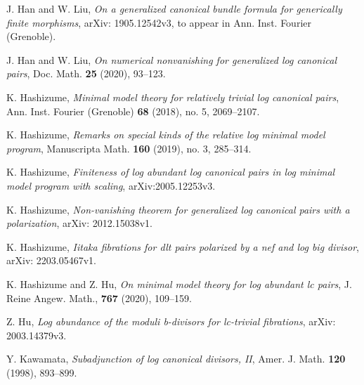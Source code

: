 \documentclass[11pt]{amsart}
\numberwithin{equation}{section}
\theoremstyle{definition}
\theoremstyle{definition}
\theoremstyle{definition}
\begin{document}
\begin{thebibliography}{99}
 J. Han and W. Liu, \textit{On a generalized canonical bundle formula for generically finite morphisms}, arXiv: 1905.12542v3,  to appear in Ann. Inst. Fourier (Grenoble).

 J. Han and W. Liu, \textit{On numerical nonvanishing for generalized log canonical pairs}, Doc. Math. \textbf{25} (2020), 93--123.

 K. Hashizume, \textit{Minimal model theory for relatively trivial log canonical pairs}, Ann. Inst. Fourier (Grenoble) \textbf{68} (2018), no. 5, 2069--2107.

 K. Hashizume, \textit{Remarks on special kinds of the relative log minimal model program}, Manuscripta Math. \textbf{160} (2019), no. 3, 285--314.


 K. Hashizume, \textit{Finiteness of log abundant log canonical pairs in log minimal model program with scaling}, arXiv:2005.12253v3.

 K. Hashizume, \textit{Non-vanishing theorem for generalized log canonical pairs with a polarization}, arXiv: 2012.15038v1.

 K. Hashizume, \textit{Iitaka fibrations for dlt pairs polarized by a nef and log big divisor}, arXiv: 2203.05467v1.


  K. Hashizume and Z. Hu, \textit{On minimal model theory for log abundant lc pairs}, J. Reine Angew. Math., \textbf{767} (2020), 109--159. 

 Z. Hu, \textit{Log abundance of the moduli b-divisors for lc-trivial fibrations}, arXiv: 2003.14379v3.





 Y. Kawamata, \textit{Subadjunction of log canonical divisors, II}, Amer. J. Math. \textbf{120} (1998), 893--899.


\end{thebibliography}
\end{document}
